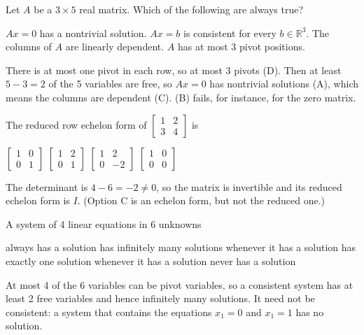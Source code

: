 \begin{question}[id=sys-4, type=msq, marks=2]
Let $A$ be a $3 \times 5$ real matrix. Which of the following are always true?
\begin{options}
  \correct $Ax = 0$ has a nontrivial solution.
  \option $Ax = b$ is consistent for every $b \in \mathbb{R}^3$.
  \correct The columns of $A$ are linearly dependent.
  \correct $A$ has at most 3 pivot positions.
\end{options}
\begin{solution}
There is at most one pivot in each row, so at most 3 pivots (D). Then at least $5 - 3 = 2$ of the 5 variables are free, so $Ax = 0$ has nontrivial solutions (A), which means the columns are dependent (C). (B) fails, for instance, for the zero matrix.
\end{solution}
\end{question}

\begin{question}[id=sys-5]
The reduced row echelon form of $\begin{bmatrix} 1 & 2 \\ 3 & 4 \end{bmatrix}$ is
\begin{options}
  \correct $\begin{bmatrix} 1 & 0 \\ 0 & 1 \end{bmatrix}$
  \option $\begin{bmatrix} 1 & 2 \\ 0 & 1 \end{bmatrix}$
  \option $\begin{bmatrix} 1 & 2 \\ 0 & -2 \end{bmatrix}$
  \option $\begin{bmatrix} 1 & 0 \\ 0 & 0 \end{bmatrix}$
\end{options}
\begin{solution}
The determinant is $4 - 6 = -2 \ne 0$, so the matrix is invertible and its reduced echelon form is $I$. (Option C is an echelon form, but not the reduced one.)
\end{solution}
\end{question}

\begin{question}[id=sys-6, marks=2]
A system of 4 linear equations in 6 unknowns
\begin{options}
  \option always has a solution
  \correct has infinitely many solutions whenever it has a solution
  \option has exactly one solution whenever it has a solution
  \option never has a solution
\end{options}
\begin{solution}
At most 4 of the 6 variables can be pivot variables, so a consistent system has at least 2 free variables and hence infinitely many solutions. It need not be consistent: a system that contains the equations $x_1 = 0$ and $x_1 = 1$ has no solution.
\end{solution}
\end{question}

